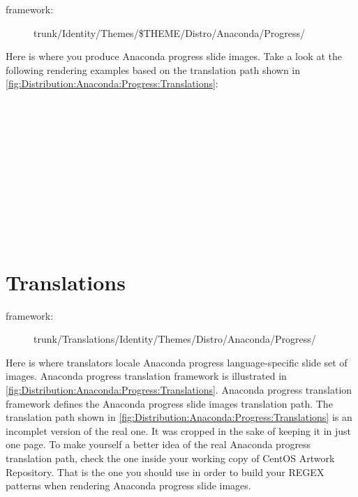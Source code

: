 \begin{description}
\item[framework:] trunk/Identity/Themes/\$THEME/Distro/Anaconda/Progress/
\end{description}

\noindent Here is where you produce Anaconda progress slide images.
Take a look at the following rendering examples based on the
translation path shown in
\autoref{fig:Distribution:Anaconda:Progress:Translations}:\\
\\
\\
\\
\\
\\
\\
\\
\\
\\
\\
\\

    \section{Translations}
\hypertarget{sec:Distribution:Anaconda:Progress:Translations}{}
      \label{sec:Distribution:Anaconda:Progress:Translations}{}

\begin{description}
\item[framework:] trunk/Translations/Identity/Themes/Distro/Anaconda/Progress/
\end{description}

\noindent Here is where translators locale Anaconda progress
language-specific slide set of images. Anaconda progress translation
framework is illustrated in
\autoref{fig:Distribution:Anaconda:Progress:Translations}.  Anaconda
progress translation framework defines the Anaconda progress slide
images translation path.  The translation path shown in
\autoref{fig:Distribution:Anaconda:Progress:Translations} is an
incomplet version of the real one.  It was cropped in the sake of
keeping it in just one page.  To make yourself a better idea of the
real Anaconda progress translation path, check the one inside your
working copy of CentOS Artwork Repository. That is the one you should
use in order to build your REGEX patterns when rendering Anaconda
progress slide images.

